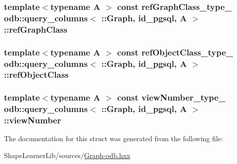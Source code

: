 \subsubsection[{ref\+Graph\+Class}]{\setlength{\rightskip}{0pt plus 5cm}template$<$typename A $>$ const ref\+Graph\+Class\+\_\+type\+\_\+ odb\+::query\+\_\+columns$<$ \+::{\bf Graph}, id\+\_\+pgsql, A $>$\+::ref\+Graph\+Class\hspace{0.3cm}{\ttfamily [static]}}\label{structodb_1_1query__columns_3_01_1_1_graph_00_01id__pgsql_00_01_a_01_4_a85755d03f15b35d1d7dbc16f8cf81854}
\hypertarget{structodb_1_1query__columns_3_01_1_1_graph_00_01id__pgsql_00_01_a_01_4_aef92d581259eceb7e4a03eb138f066ee}{}
\subsubsection[{ref\+Object\+Class}]{\setlength{\rightskip}{0pt plus 5cm}template$<$typename A $>$ const ref\+Object\+Class\+\_\+type\+\_\+ odb\+::query\+\_\+columns$<$ \+::{\bf Graph}, id\+\_\+pgsql, A $>$\+::ref\+Object\+Class\hspace{0.3cm}{\ttfamily [static]}}\label{structodb_1_1query__columns_3_01_1_1_graph_00_01id__pgsql_00_01_a_01_4_aef92d581259eceb7e4a03eb138f066ee}
\hypertarget{structodb_1_1query__columns_3_01_1_1_graph_00_01id__pgsql_00_01_a_01_4_a443a7d11572f4fd05b99ba9c84280bda}{}
\subsubsection[{view\+Number}]{\setlength{\rightskip}{0pt plus 5cm}template$<$typename A $>$ const {\bf view\+Number\+\_\+type\+\_\+} odb\+::query\+\_\+columns$<$ \+::{\bf Graph}, id\+\_\+pgsql, A $>$\+::view\+Number\hspace{0.3cm}{\ttfamily [static]}}\label{structodb_1_1query__columns_3_01_1_1_graph_00_01id__pgsql_00_01_a_01_4_a443a7d11572f4fd05b99ba9c84280bda}


The documentation for this struct was generated from the following file\+:\begin{DoxyCompactItemize}
\item 
Shape\+Learner\+Lib/sources/\hyperlink{_graph-odb_8hxx}{Graph-\/odb.\+hxx}\end{DoxyCompactItemize}
